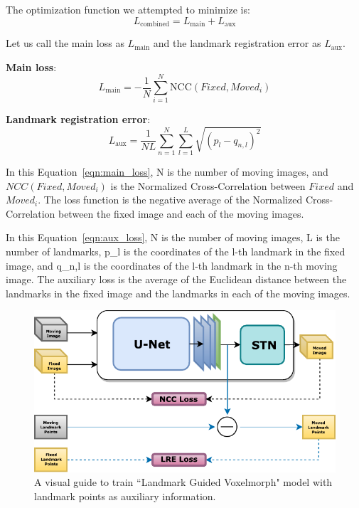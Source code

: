 \documentclass{book}
\begin{document}
	The optimization function we attempted to minimize is:
	\begin{equation}
	L_\text{combined} = L_\text{main} + L_\text{aux} \label{eqn:combined_loss}
	\end{equation}	
	
	Let us call the main loss as $L_\text{main}$ and the landmark registration error as $L_\text{aux}$.
	
	\textbf{Main loss}:
	\begin{equation}
	L_\text{main} = -\frac{1}{N} \sum_{i=1}^N \text{NCC}(Fixed, Moved_i) \label{eqn:main_loss}
	\end{equation}
	
	\textbf{Landmark registration error}:
	\begin{equation}
		L_\text{aux} = \frac{1}{NL} \sum_{n=1}^N \sum_{l=1}^L \sqrt{(p_l - q_{n,l})^2}
		\label{eqn:aux_loss}
	\end{equation}
	
	In this Equation~\ref{eqn:main_loss}, N is the number of moving images, and $NCC(Fixed, Moved_i)$ is the Normalized Cross-Correlation between $Fixed$ and $Moved_i$. The loss function is the negative average of the Normalized Cross-Correlation between the fixed image and each of the moving images.
	
	In this Equation~\ref{eqn:aux_loss}, N is the number of moving images, L is the number of landmarks, p\_l is the coordinates of the l-th landmark in the fixed image, and q\_{n,l} is the coordinates of the l-th landmark in the n-th moving image. The auxiliary loss is the average of the Euclidean distance between the landmarks in the fixed image and the landmarks in each of the moving images.
	
	\begin{figure}[h!]
		\centering
		\includegraphics[width=0.6\columnwidth]{resources/chapter4/methods/Method2.pdf}
		\caption{A visual guide to train ``Landmark Guided Voxelmorph" model with landmark points as auxiliary information.}
		\label{fig:block_method2}
	\end{figure}
\end{document}
